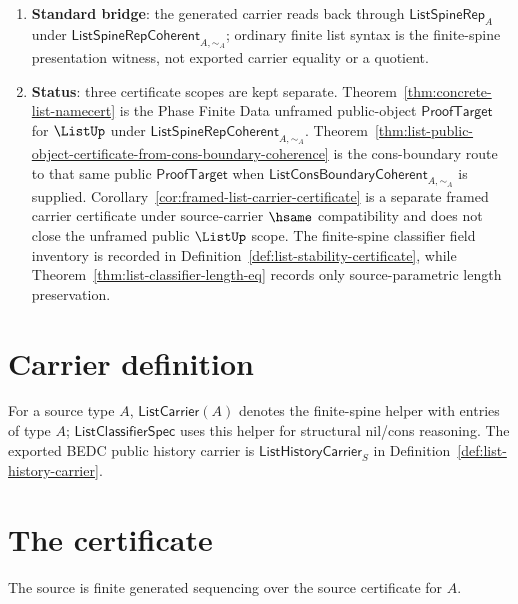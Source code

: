\begin{enumerate}
  \item \textbf{Standard bridge}: the generated carrier reads back through $\mathsf{ListSpineRep}_A$ under $\mathsf{ListSpineRepCoherent}_{A,\sim_A}$; ordinary finite list syntax is the finite-spine presentation witness, not exported carrier equality or a quotient.
  \item \textbf{Status}: three certificate scopes are kept separate. Theorem~\ref{thm:concrete-list-namecert} is the Phase Finite Data unframed public-object $\mathsf{ProofTarget}$ for $\ListUp$ under $\mathsf{ListSpineRepCoherent}_{A,\sim_A}$. Theorem~\ref{thm:list-public-object-certificate-from-cons-boundary-coherence} is the cons-boundary route to that same public $\mathsf{ProofTarget}$ when $\mathsf{ListConsBoundaryCoherent}_{A,\sim_A}$ is supplied. Corollary~\ref{cor:framed-list-carrier-certificate} is a separate framed carrier certificate under source-carrier $\hsame$ compatibility and does not close the unframed public $\ListUp$ scope. The finite-spine classifier field inventory is recorded in Definition~\ref{def:list-stability-certificate}, while Theorem~\ref{thm:list-classifier-length-eq} records only source-parametric length preservation.
\end{enumerate}

\section{Carrier definition}

\begin{definition}
\label{def:list-carrier}
For a source type $A$, $\mathsf{ListCarrier}(A)$ denotes the finite-spine helper with entries of type $A$; $\mathsf{ListClassifierSpec}$ uses this helper for structural nil/cons reasoning. The exported BEDC public history carrier is $\mathsf{ListHistoryCarrier}_S$ in Definition~\ref{def:list-history-carrier}.
\end{definition}

\section{The certificate}

\begin{definition}
\label{def:list-source-specification}
The source is finite generated sequencing over the source certificate for \(A\).
\end{definition}

